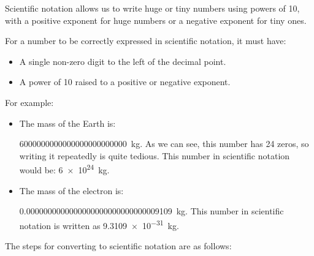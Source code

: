 Scientific notation allows us to write huge or tiny numbers using powers of \num{10}, with a positive exponent for huge numbers or a negative exponent for tiny ones.

For a number to be correctly expressed in scientific notation, it must have:

\begin{itemize}
    \item A single non-zero digit to the left of the decimal point.
    \item A power of 10 raised to a positive or negative exponent.
\end{itemize}

For example:

\begin{itemize}
    \item The mass of the Earth is:

    \qty{6000000000000000000000000}{\kilo\g}.
    As we can see, this number has 24 zeros, so writing it repeatedly is quite tedious.
    This number in scientific notation would be: \qty{6e24}{\kilo\g}.

    \item The mass of the electron is:

    \qty{0.0000000000000000000000000000009109}{\kilo\g}.
    This number in scientific notation is written as \qty{9.3109e-31}{\kilo\g}.
\end{itemize}

The steps for converting to scientific notation are as follows:


